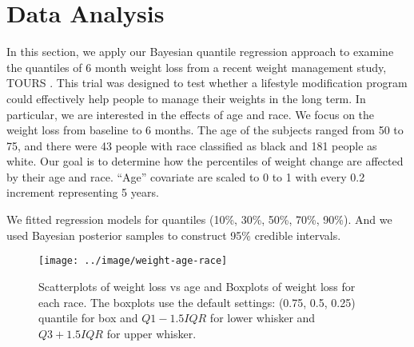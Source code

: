 \documentclass[12pt]{article}
\begin{document}
\section{Data Analysis}
\label{ch2:sec:tours}
In this section, we apply our Bayesian quantile regression approach to
examine the quantiles of 6 month weight loss from a recent weight
management study, TOURS \citep{perri2008extended}.  This trial was designed
to test whether a lifestyle modification program could effectively
help people to manage their weights in the long term.  In particular,
we are interested in the effects of age and race.  We focus on the
weight loss from baseline to 6 months. The age of the subjects ranged
from 50 to 75, and there were 43 people with race classified as black
and 181 people as white.  Our goal is to determine how the percentiles
of weight change are affected by their age and race.  ``Age''
covariate are scaled to 0 to 1 with every 0.2 increment representing 5
years.

We fitted regression models for quantiles (10\%, 30\%, 50\%, 70\%,
90\%). And we used Bayesian posterior samples to construct 95\%
credible intervals.

\begin{figure}[htbp]
  \centerline{\texttt{[image: ../image/weight-age-race]}}
  \caption[]{\label{ch2:fig:tours} Scatterplots of weight loss vs age and
    Boxplots of weight loss for each race.  The boxplots use the
    default settings: (0.75, 0.5, 0.25) quantile for box and
    $Q1-1.5IQR$ for lower whisker and $Q3+1.5IQR$ for upper whisker. }
\end{figure}
\end{document}
